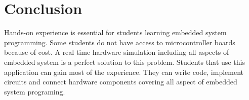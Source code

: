 \chapter{Conclusion}\label{chap:concl}


Hands-on experience is essential for students learning embedded system programming. Some students do not have access to microcontroller boards because of cost. A real time hardware simulation including all aspects of embedded system is a perfect solution to this problem. Students that use this application can gain most of the experience. They can write code, implement circuits and connect hardware components covering all aspect of embedded system programing.